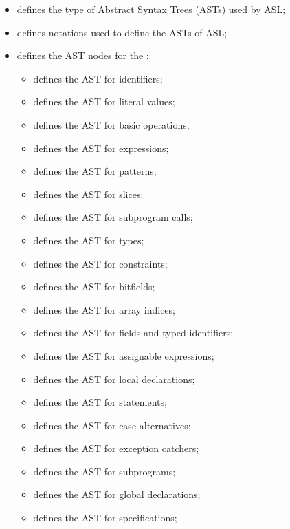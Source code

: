 \ChapterOutline
\begin{itemize}
  \item {} defines the type of Abstract Syntax Trees (ASTs) used by ASL;
  \item {} defines notations used to define the ASTs of ASL;
  \item {} defines the AST nodes for the \untypedast:
  \begin{itemize}
    \item {} defines the AST for identifiers;
    \item {} defines the AST for literal values;
    \item {} defines the AST for basic operations;
    \item {} defines the AST for expressions;
    \item {} defines the AST for patterns;
    \item {} defines the AST for slices;
    \item {} defines the AST for subprogram calls;
    \item {} defines the AST for types;
    \item {} defines the AST for constraints;
    \item {} defines the AST for bitfields;
    \item {} defines the AST for array indices;
    \item {} defines the AST for fields and typed identifiers;
    \item {} defines the AST for assignable expressions;
    \item {} defines the AST for local declarations;
    \item {} defines the AST for statements;
    \item {} defines the AST for case alternatives;
    \item {} defines the AST for exception catchers;
    \item {} defines the AST for subprograms;
    \item {} defines the AST for global declarations;
    \item {} defines the AST for specifications;

\end{itemize}
\end{itemize}
